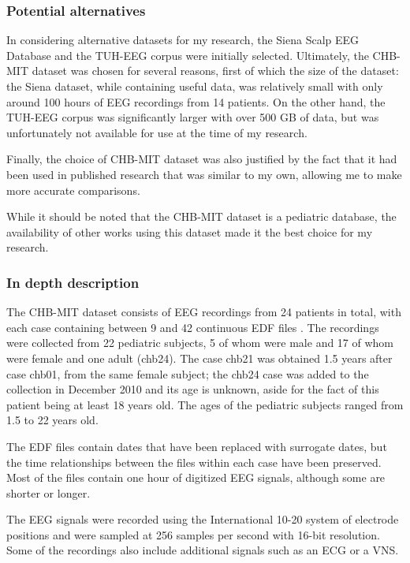 \subsubsection{Potential alternatives}
In considering alternative datasets for my research, the Siena Scalp EEG Database and the \gls{TUH-EEG} corpus were initially selected. Ultimately, the \gls{CHB-MIT} dataset was chosen for several reasons, first of which the size of the dataset: the Siena dataset, while containing useful data, was relatively small with only around 100 hours of \gls{EEG} recordings from 14 patients. On the other hand, the \gls{TUH-EEG} corpus was significantly larger with over 500 GB of data, but was unfortunately not available for use at the time of my research.

Finally, the choice of \gls{CHB-MIT} dataset was also justified by the fact that it had been used in published research that was similar to my own, allowing me to make more accurate comparisons. 

While it should be noted that the \gls{CHB-MIT} dataset is a pediatric database, the availability of other works using this dataset made it the best choice for my research.

\subsubsection{In depth description}
The \gls{CHB-MIT} dataset consists of \gls{EEG} recordings from 24 patients in total, with each case containing between 9 and 42 continuous \gls{EDF} files \cite{shoeb_chb-mit_2010}. The recordings were collected from 22 pediatric subjects, 5 of whom were male and 17 of whom were female and one adult (chb24). The case chb21 was obtained 1.5 years after case chb01, from the same female subject; the chb24 case was added to the collection in December 2010 and its age is unknown, aside for the fact of this patient being at least 18 years old. The ages of the pediatric subjects ranged from 1.5 to 22 years old.

The \gls{EDF} files contain dates that have been replaced with surrogate dates, but the time relationships between the files within each case have been preserved. Most of the files contain one hour of digitized \gls{EEG} signals, although some are shorter or longer. 

The \gls{EEG} signals were recorded using the International 10-20 system of electrode positions and were sampled at 256 samples per second with 16-bit resolution. Some of the recordings also include additional signals such as an \gls{ECG} or a \gls{VNS}. 

